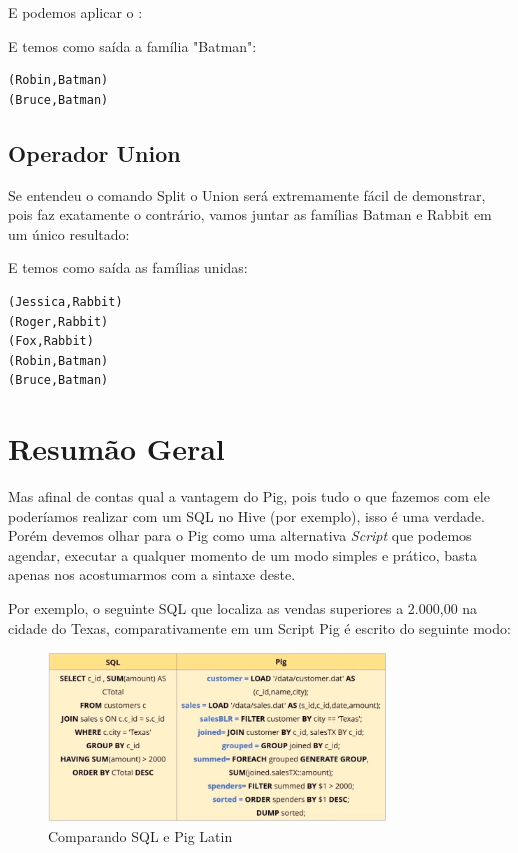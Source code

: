 \documentclass[a4paper,11pt]{article}
\begin{document}
E podemos aplicar o : \\

E temos como saída a família "Batman":
\begin{lstlisting}[]
(Robin,Batman)
(Bruce,Batman)
\end{lstlisting}

\subsection{Operador Union}
Se entendeu o comando Split o Union será extremamente fácil de demonstrar, pois faz exatamente o contrário, vamos juntar as famílias Batman e Rabbit em um único resultado: \\

E temos como saída as famílias unidas:
\begin{lstlisting}[]
(Jessica,Rabbit)
(Roger,Rabbit)
(Fox,Rabbit)
(Robin,Batman)
(Bruce,Batman)
\end{lstlisting}

\section{Resumão Geral}
Mas afinal de contas qual a vantagem do Pig, pois tudo o que fazemos com ele poderíamos realizar com um SQL no Hive (por exemplo), isso é uma verdade. Porém devemos olhar para o Pig como uma alternativa \textit{Script} que podemos agendar, executar a qualquer momento de um modo simples e prático, basta apenas nos acostumarmos com a sintaxe deste. 

Por exemplo, o seguinte SQL que localiza as vendas superiores a 2.000,00 na cidade do Texas, comparativamente em um Script Pig é escrito do seguinte modo:
\begin{figure}[H]
	\centering
	\includegraphics[width=0.8\textwidth]{imagem/vendas}
	\caption{Comparando SQL e Pig Latin}
\end{figure}
\end{document}
